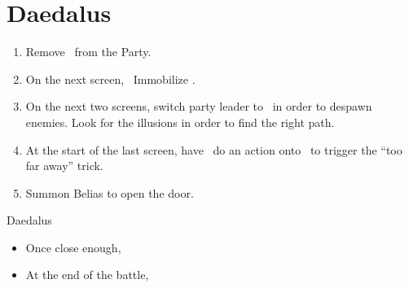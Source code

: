 \chapter{Daedalus}

\begin{enumerate}
	\vaanf Remedy \vaan, if he didn't block Nectar Volley
	\penelof Dispell Penelo
	\ashef Hi-Potion \vaan\ if needed
	\item Remove \ashe\ from the Party.
	\item On the next screen, \penelo\ Immobilize \penelo.
	\item On the next two screens, switch party leader to \penelo\ in order to despawn enemies. Look for the illusions in order to find the right path.
	\item At the start of the last screen, have \penelo\ do an action onto \vaan\ to trigger the ``too far away'' trick.
	\item Summon Belias to open the door.
\end{enumerate}
\begin{menu}
	\party{\balthier, \ashe, \penelo}
\end{menu}
\begin{equip}
	\begin{itemize}
		\optimize{\penelo, \ashe}
	\end{itemize}
\end{equip}
\begin{gambit}
	\begin{itemize}
		\ashegambit{Bio}
		\penelogambit{Bio}
	\end{itemize}
\end{gambit}
\begin{battle}{Daedalus}
	\begin{itemize}
		\penelof Dispell \ashe
		\penelof Reflect \penelo
		\ashef Reflect \balthier
		\ashef Reflect \ashe
		\balthierf Spam Confuse on  and run in circles to regenerate MP
		\item Once close enough, \GirlsGambitOn
		\item At the end of the battle, \GirlsGambitOff
	\end{itemize}
\end{battle}
